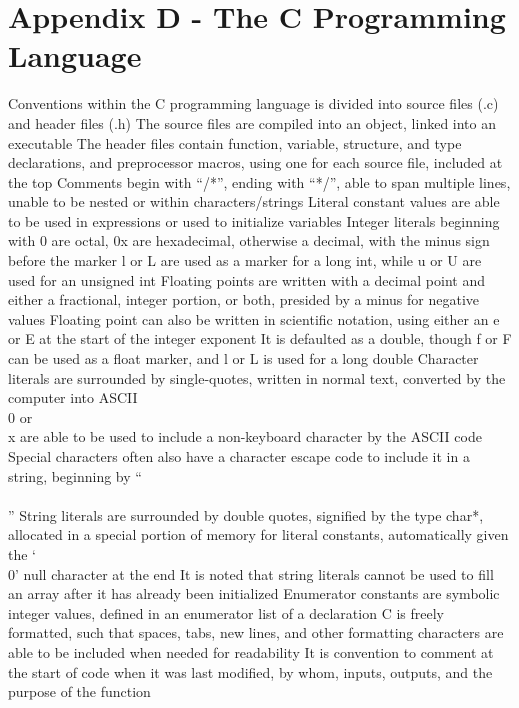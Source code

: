 \documentclass[11 pt, twoside]{article}
\newenvironment{outline*}
{
	\begin{outline}[enumerate]
	}
	{\end{outline}
}
\begin{document}
\section{Appendix D - The C Programming Language}
\begin{outline*}
\1 Conventions within the C programming language is divided into source files (.c) and header files (.h)
\2 The source files are compiled into an object, linked into an executable
\2 The header files contain function, variable, structure, and type declarations, and preprocessor macros, using one for each source file, included at the top
\2 Comments begin with ``/*'', ending with ``*/'', able to span multiple lines, unable to be nested or within characters/strings
\2 Literal constant values are able to be used in expressions or used to initialize variables
\3 Integer literals beginning with 0 are octal, 0x are hexadecimal, otherwise a decimal, with the minus sign before the marker
\4 l or L are used as a marker for a long int, while u or U are used for an unsigned int
\3 Floating points are written with a decimal point and either a fractional, integer portion, or both, presided by a minus for negative values
\4 Floating point can also be written in scientific notation, using either an e or E at the start of the integer exponent
\4 It is defaulted as a double, though f or F can be used as a float marker, and l or L is used for a long double
\3 Character literals are surrounded by single-quotes, written in normal text, converted by the computer into ASCII
\4 \\0 or \\x are able to be used to include a non-keyboard character by the ASCII code
\4 Special characters often also have a character escape code to include it in a string, beginning by ``\\\\''
\3 String literals are surrounded by double quotes, signified by the type char*, allocated in a special portion of memory for literal constants, automatically given the `\\0' null character at the end
\4 It is noted that string literals cannot be used to fill an array after it has already been initialized
\3 Enumerator constants are symbolic integer values, defined in an enumerator list of a declaration
\2 C is freely formatted, such that spaces, tabs, new lines, and other formatting characters are able to be included when needed for readability
\3 It is convention to comment at the start of code when it was last modified, by whom, inputs, outputs, and the purpose of the function

\end{outline*}
\end{document}
